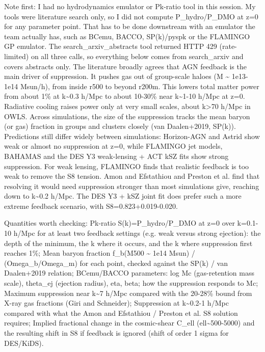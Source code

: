 \documentclass[11pt,a4paper]{article}
\begin{document}
Note first: I had no hydrodynamics emulator or Pk-ratio tool in this session. My tools were literature search only, so I did not compute P\_hydro/P\_DMO at z=0 for any parameter point. That has to be done downstream with an emulator the team actually has, such as BCemu, BACCO, SP(k)/pyspk or the FLAMINGO GP emulator. The search\_arxiv\_abstracts tool returned HTTP 429 (rate-limited) on all three calls, so everything below comes from search\_arxiv and covers abstracts only. The literature broadly agrees that AGN feedback is the main driver of suppression. It pushes gas out of group-scale haloes (M \textasciitilde{} 1e13-1e14 Msun/h), from inside r500 to beyond r200m. This lowers total matter power from about 1\% at k\textasciitilde{}0.3 h/Mpc to about 10-30\% near k\textasciitilde{}1-10 h/Mpc at z=0. Radiative cooling raises power only at very small scales, about k\textgreater{}70 h/Mpc in OWLS. Across simulations, the size of the suppression tracks the mean baryon (or gas) fraction in groups and clusters closely (van Daalen+2019, SP(k)). Predictions still differ widely between simulations: Horizon-AGN and Astrid show weak or almost no suppression at z=0, while FLAMINGO jet models, BAHAMAS and the DES Y3 weak-lensing + ACT kSZ fits show strong suppression. For weak lensing, FLAMINGO finds that realistic feedback is too weak to remove the S8 tension. Amon and Efstathiou and Preston et al. find that resolving it would need suppression stronger than most simulations give, reaching down to k\textasciitilde{}0.2 h/Mpc. The DES Y3 + kSZ joint fit does prefer such a more extreme feedback scenario, with S8=0.823+0.019-0.020.

Quantities worth checking: Pk-ratio S(k)=P\_hydro/P\_DMO at z=0 over k=0.1-10 h/Mpc for at least two feedback settings (e.g. weak versus strong ejection): the depth of the minimum, the k where it occurs, and the k where suppression first reaches 1\%; Mean baryon fraction f\_b(M500 \textasciitilde{} 1e14 Msun) / (Omega\_b/Omega\_m) for each point, checked against the SP(k) / van Daalen+2019 relation; BCemu/BACCO parameters: log Mc (gas-retention mass scale), theta\_ej (ejection radius), eta, beta; how the suppression responds to Mc; Maximum suppression near k\textasciitilde{}7 h/Mpc compared with the 20-28\% bound from X-ray gas fractions (Giri and Schneider); Suppression at k\textasciitilde{}0.2-1 h/Mpc compared with what the Amon and Efstathiou / Preston et al. S8 solution requires; Implied fractional change in the cosmic-shear C\_ell (ell\textasciitilde{}500-5000) and the resulting shift in S8 if feedback is ignored (shift of order 1 sigma for DES/KiDS).
\end{document}
